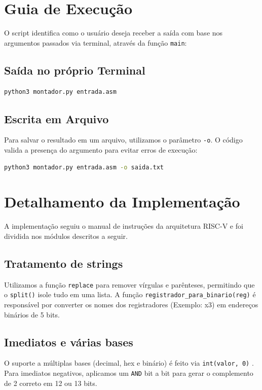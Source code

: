 \documentclass[12pt]{article}
\begin{document}
\section{Guia de Execução}
O script identifica como o usuário deseja receber a saída com base nos argumentos passados via terminal, através da função \texttt{main}:

\subsection{Saída no próprio Terminal}
\begin{lstlisting}[language=bash]
python3 montador.py entrada.asm
\end{lstlisting}

\subsection{Escrita em Arquivo}
Para salvar o resultado em um arquivo, utilizamos o parâmetro \texttt{-o}. O código valida a presença do argumento para evitar erros de execução:
\begin{lstlisting}[language=bash]
python3 montador.py entrada.asm -o saida.txt
\end{lstlisting}

\section{Detalhamento da Implementação}
A implementação seguiu o manual de instruções da arquitetura RISC-V \cite{riscv_isa} e foi dividida nos módulos descritos a seguir.

\subsection{Tratamento de strings}
Utilizamos a função \texttt{replace} para remover vírgulas e parênteses, permitindo que o \texttt{split()} isole tudo em uma lista. A função \texttt{registrador\_para\_binario(reg)} é responsável por converter os nomes dos registradores (Exemplo: x3) em endereços binários de 5 bits.

\subsection{Imediatos e várias bases}
O suporte a múltiplas bases (decimal, hex e binário) é feito via \texttt{int(valor, 0)} \cite{python_bitwise}. Para imediatos negativos, aplicamos um \texttt{AND} bit a bit para gerar o complemento de 2 correto em 12 ou 13 bits.
\end{document}
